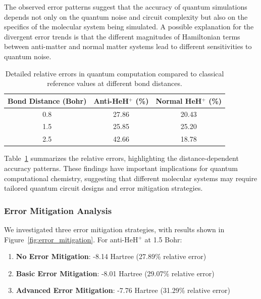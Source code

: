 \documentclass[10pt,twocolumn,a4paper]{article}
\begin{document}
The observed error patterns suggest that the accuracy of quantum simulations depends not only on the quantum noise and circuit complexity but also on the specifics of the molecular system being simulated. A possible explanation for the divergent error trends is that the different magnitudes of Hamiltonian terms between anti-matter and normal matter systems lead to different sensitivities to quantum noise.

\begin{table}[t!]
\centering
\caption{Detailed relative errors in quantum computation compared to classical reference values at different bond distances.}
\label{tab:rel_errors}
\begin{tabular}{@{}ccc@{}}
\toprule
Bond Distance (Bohr) & Anti-HeH$^+$ (\%) & Normal HeH$^+$ (\%) \\
\midrule
0.8 & 27.86 & 20.43 \\
1.5 & 25.85 & 25.20 \\
2.5 & 42.66 & 18.78 \\
\bottomrule
\end{tabular}
\end{table}

Table~\ref{tab:rel_errors} summarizes the relative errors, highlighting the distance-dependent accuracy patterns. These findings have important implications for quantum computational chemistry, suggesting that different molecular systems may require tailored quantum circuit designs and error mitigation strategies.

\subsubsection{Error Mitigation Analysis}
We investigated three error mitigation strategies, with results shown in Figure~\ref{fig:error_mitigation}. For anti-HeH$^+$ at 1.5 Bohr:

\begin{enumerate}
    \item \textbf{No Error Mitigation}: -8.14 Hartree (27.89\% relative error)
    \item \textbf{Basic Error Mitigation}: -8.01 Hartree (29.07\% relative error)
    \item \textbf{Advanced Error Mitigation}: -7.76 Hartree (31.29\% relative error)
\end{enumerate}
\end{document}
